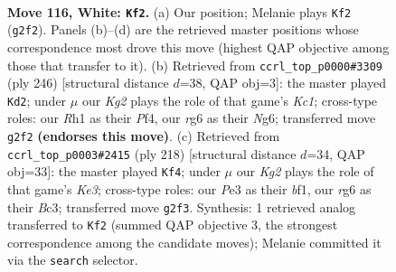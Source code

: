 \documentclass[11pt]{article}
\begin{document}
\clearpage

\begin{figure}[p]\centering
\begin{subfigure}{0.46\textwidth}\centering
\resizebox{\linewidth}{!}{%
\newchessgame
\chessboard[
  setfen={2k5/8/p5r1/P1p2p1p/1p3P1P/1P2P1P1/6K1/7R w - - 19 116},
  showmover=false,
  pgfstyle=straightmove, color=movearrow, markmove={g2-f2}
]}
\caption{}
\end{subfigure}\hfill
\begin{subfigure}{0.46\textwidth}\centering
\resizebox{\linewidth}{!}{%
\newchessgame
\chessboard[
  setfen={8/1b6/3k2N1/1p3p2/p1pP1Pp1/P1P3P1/1P6/2K5 w - - 29 124},
  showmover=false,
  pgfstyle=straightmove, color=movearrow, markmove={c1-d2}
]}
\caption{}
\end{subfigure}
\\[4pt]
\begin{subfigure}{0.46\textwidth}\centering
\resizebox{\linewidth}{!}{%
\newchessgame
\chessboard[
  setfen={6k1/2R5/4rpp1/7p/4P2P/2B1KPP1/8/5b2 w - - 53 110},
  showmover=false,
  pgfstyle=straightmove, color=movearrow, markmove={e3-f4}
]}
\caption{}
\end{subfigure}\hfill

\caption{\textbf{Move 116, White: \texttt{Kf2}.} (a) Our position; Melanie plays \texttt{Kf2} (\texttt{g2f2}). Panels (b)--(d) are the retrieved master positions whose correspondence most drove this move (highest QAP objective among those that transfer to it). (b) Retrieved from \texttt{ccrl\_top\_p0000\#3309} (ply 246) [structural distance $d$=38, QAP obj=3]: the master played \texttt{Kd2}; under $\mu$ our \emph{Kg2} plays the role of that game's \emph{Kc1}; cross-type roles: our \emph{R}h1 as their \emph{P}f4, our \emph{r}g6 as their \emph{N}g6; transferred move \texttt{g2f2} \textbf{(endorses this move)}. (c) Retrieved from \texttt{ccrl\_top\_p0003\#2415} (ply 218) [structural distance $d$=34, QAP obj=33]: the master played \texttt{Kf4}; under $\mu$ our \emph{Kg2} plays the role of that game's \emph{Ke3}; cross-type roles: our \emph{P}e3 as their \emph{b}f1, our \emph{r}g6 as their \emph{B}c3; transferred move \texttt{g2f3}. Synthesis: 1 retrieved analog transferred to \texttt{Kf2} (summed QAP objective 3, the strongest correspondence among the candidate moves); Melanie committed it via the \texttt{search} selector.}
\label{fig:thought-m230}
\end{figure}

\clearpage
\end{document}
